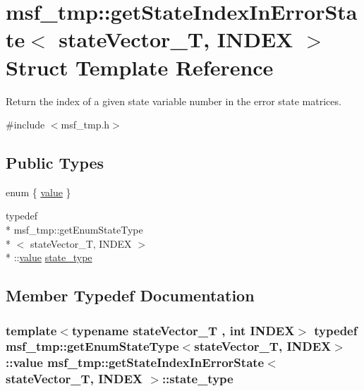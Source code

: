 \hypertarget{structmsf__tmp_1_1getStateIndexInErrorState}{\section{msf\-\_\-tmp\-:\-:get\-State\-Index\-In\-Error\-State$<$ state\-Vector\-\_\-\-T, I\-N\-D\-E\-X $>$ Struct Template Reference}
\label{structmsf__tmp_1_1getStateIndexInErrorState}
}


Return the index of a given state variable number in the error state matrices.  




{\ttfamily \#include $<$msf\-\_\-tmp.\-h$>$}

\subsection*{Public Types}
\begin{DoxyCompactItemize}
\item 
enum \{ \hyperlink{structmsf__tmp_1_1getStateIndexInErrorState_a6f6fe71c12d4393db96e8a7c725cbf2fa21b2b175ce5d62b85728106fd9a6d990}{value}
 \}
\item 
typedef \\*
msf\-\_\-tmp\-::get\-Enum\-State\-Type\\*
$<$ state\-Vector\-\_\-\-T, I\-N\-D\-E\-X $>$\\*
\-::\hyperlink{structmsf__tmp_1_1getStateIndexInErrorState_a6f6fe71c12d4393db96e8a7c725cbf2fa21b2b175ce5d62b85728106fd9a6d990}{value} \hyperlink{structmsf__tmp_1_1getStateIndexInErrorState_a4a602d089be0d8af2d0faa443a2ce62e}{state\-\_\-type}
\end{DoxyCompactItemize}


\subsection{Member Typedef Documentation}
\hypertarget{structmsf__tmp_1_1getStateIndexInErrorState_a4a602d089be0d8af2d0faa443a2ce62e}{
\subsubsection[{state\-\_\-type}]{\setlength{\rightskip}{0pt plus 5cm}template$<$typename state\-Vector\-\_\-\-T , int I\-N\-D\-E\-X$>$ typedef msf\-\_\-tmp\-::get\-Enum\-State\-Type$<$state\-Vector\-\_\-\-T, I\-N\-D\-E\-X$>$\-::{\bf value} {\bf msf\-\_\-tmp\-::get\-State\-Index\-In\-Error\-State}$<$ state\-Vector\-\_\-\-T, I\-N\-D\-E\-X $>$\-::{\bf state\-\_\-type}}}\label{structmsf__tmp_1_1getStateIndexInErrorState_a4a602d089be0d8af2d0faa443a2ce62e}


